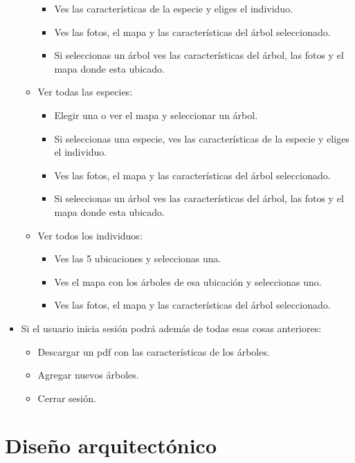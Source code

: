 \begin{itemize}
\begin{itemize}
\begin{itemize}
			\item Ves las características de la especie y eliges el individuo.
			\item Ves las fotos, el mapa y las características del árbol seleccionado.
			\item Si seleccionas un árbol ves las características del árbol, las fotos y el mapa donde esta ubicado. 
		\end{itemize}
		\item Ver todas las especies:
		\begin{itemize}
			\item Elegir una o ver el mapa y seleccionar un árbol.
			\item Si seleccionas una especie, ves las características de la especie y eliges el individuo.
			\item Ves las fotos, el mapa y las características del árbol seleccionado.
			\item Si seleccionas un árbol ves las características del árbol, las fotos y el mapa donde esta ubicado.
		\end{itemize}
		\item Ver todos los individuos:
		\begin{itemize}
			\item Ves las 5 ubicaciones y seleccionas una.
			\item Ves el mapa con los árboles de esa ubicación y seleccionas uno.
			\item Ves las fotos, el mapa y las características del árbol seleccionado.
		\end{itemize}
	\end{itemize}
	\item Si el usuario inicia sesión podrá además de todas esas cosas anteriores:
	\begin{itemize}
		\item Descargar un pdf con las características de los árboles.
		\item Agregar nuevos árboles.
		\item Cerrar sesión.
	\end{itemize}
	
\end{itemize}


\section{Diseño arquitectónico}

